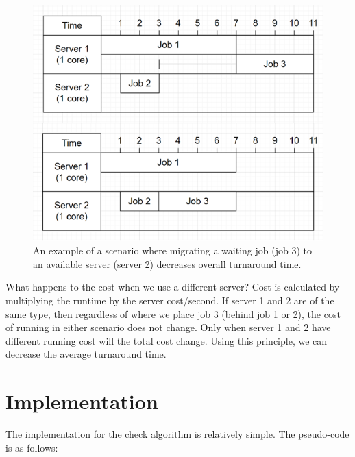 \documentclass[a4paper]{article} %
\begin{document}
\begin{figure}
    \centering
    \includegraphics{migExample.png}
    \caption{An example of a scenario where migrating a waiting job (job 3) to an available server (server 2) decreases overall turnaround time.}
    \label{fig:example}
\end{figure}

What happens to the cost when we use a different server? Cost is calculated by multiplying the runtime by the server cost/second. If server 1 and 2 are of the same type, then regardless of where we place job 3 (behind job 1 or 2), the cost of running in either scenario does not change. Only when server 1 and 2 have different running cost will the total cost change. Using this principle, we can decrease the average turnaround time. \par

\section{Implementation}

The implementation for the check algorithm is relatively simple. The pseudo-code is as follows:\par
\end{document}
